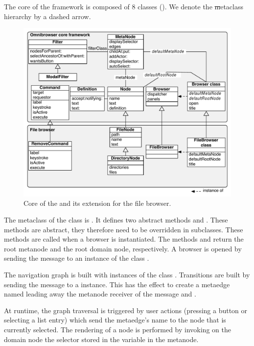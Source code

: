 \documentclass[a4paper,10pt,twoside]{book}
\begin{document}
The core of the \ob framework is composed of 8 classes (). We denote the \st metaclass hierarchy by a dashed arrow. 

\begin{figure}[!ht]
\begin{center}
\includegraphics[scale=0.52]{Core}
\caption{Core of the \obf and its extension for the file browser.} 
\end{center}
\end{figure}

The metaclass of the class  is . It defines two abstract methods  and . These methods are abstract, they therefore need to be overridden in subclasses. These methods are called when a browser is instantiated. The methods   and  return the root metanode and the root domain node, respectively. A browser is opened by sending the message  to an instance of the class .

The navigation graph is built with instances of the class . Transitions are built by sending the message  to a  instance. This has the effect to create a metaedge named  leading away the metanode receiver of the message and .

At runtime, the graph traversal is triggered by user actions (\eg pressing a button or selecting a list entry) which send the metaedge's name to the node that is currently selected. The rendering of a node is performed by invoking on the domain node the selector stored in the variable  in the metanode.
\end{document}
